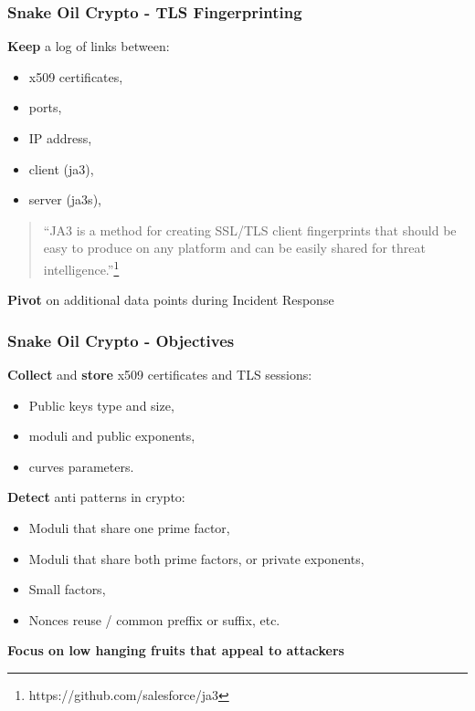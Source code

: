 \documentclass{beamer}
\begin{document}
\begin{frame}
  \frametitle{Snake Oil Crypto - TLS Fingerprinting}
        {\bf Keep} a log of links between:
        \begin{itemize}
          \item x509 certificates,
          \item ports,
          \item IP address,
          \item client (ja3),
          \item server (ja3s),
        \end{itemize}
        \begin{quote}
        ``JA3 is a method for creating SSL/TLS client fingerprints that should be easy to produce on any platform and can be easily shared for threat intelligence.''\footnote{https://github.com/salesforce/ja3}
        \end{quote}

         {\bf Pivot} on additional data points during Incident Response 
\end{frame}

\begin{frame}
   \frametitle{Snake Oil Crypto -  Objectives}
   {\bf Collect} and {\bf store} x509 certificates and TLS sessions:
        \begin{itemize}
        \item Public keys type and size,
        \item moduli and public exponents,
        \item curves parameters.
        \end{itemize}
        {\bf Detect} anti patterns in crypto:
        \begin{itemize}
          \item Moduli that share one prime factor,
          \item Moduli that share both prime factors, or private exponents,
          \item Small factors,
          \item Nonces reuse / common preffix or suffix, etc. 
        \end{itemize}
        \vspace{5 mm}
        {\bf Focus on low hanging fruits that appeal to attackers}
\end{frame}
\end{document}
